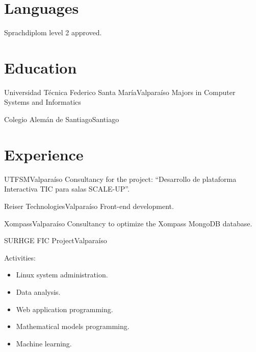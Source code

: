 \documentclass[11pt,letterpaper,sans]{moderncv}
\begin{document}
  \makecvtitle{}

  \section{Languages}
      {Sprachdiplom level 2 approved.}

  \section{Education}
      {Universidad Técnica Federico Santa María}{Valparaíso}
      {}
      {Majors in Computer Systems and Informatics}

      {Colegio Alemán de Santiago}{Santiago}{}
      {}

  \section{Experience}
      {UTFSM}{Valparaíso}{}
      {
        Consultancy for the project: ``Desarrollo de plataforma Interactiva TIC
        para salas SCALE-UP''.
      }

    \pagebreak[0]

      {Reiser Technologies}{Valparaíso}{}
      {
        Front-end development.
      }

    \pagebreak[0]

      {Xompass}{Valparaíso}{}
      {
        Consultancy to optimize the Xompass MongoDB database.
      }

    \pagebreak[0]

      {SURHGE FIC Project}{Valparaíso}{}
      {
        Activities:
        \begin{itemize}
          \item Linux system administration.
          \item Data analysis.
          \item Web application programming.
          \item Mathematical models programming.
          \item Machine learning.
        \end{itemize}
      }
\end{document}
